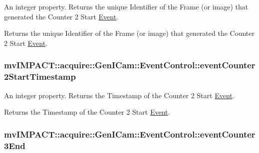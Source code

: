 An integer property. Returns the unique Identifier of the Frame (or image) that generated the Counter 2 Start \hyperlink{classmv_i_m_p_a_c_t_1_1acquire_1_1_event}{Event}. 

Returns the unique Identifier of the Frame (or image) that generated the Counter 2 Start \hyperlink{classmv_i_m_p_a_c_t_1_1acquire_1_1_event}{Event}. \hypertarget{classmv_i_m_p_a_c_t_1_1acquire_1_1_gen_i_cam_1_1_event_control_a5704b9998f9c86ece2bdfa825b7e3216}{
\subsubsection[{event\+Counter2\+Start\+Timestamp}]{ mv\+I\+M\+P\+A\+C\+T\+::acquire\+::\+Gen\+I\+Cam\+::\+Event\+Control\+::event\+Counter2\+Start\+Timestamp}}\label{classmv_i_m_p_a_c_t_1_1acquire_1_1_gen_i_cam_1_1_event_control_a5704b9998f9c86ece2bdfa825b7e3216}


An integer property. Returns the Timestamp of the Counter 2 Start \hyperlink{classmv_i_m_p_a_c_t_1_1acquire_1_1_event}{Event}. 

Returns the Timestamp of the Counter 2 Start \hyperlink{classmv_i_m_p_a_c_t_1_1acquire_1_1_event}{Event}. \hypertarget{classmv_i_m_p_a_c_t_1_1acquire_1_1_gen_i_cam_1_1_event_control_aeabdf10aee695943d0e55c09e7ff4fc7}{
\subsubsection[{event\+Counter3\+End}]{ mv\+I\+M\+P\+A\+C\+T\+::acquire\+::\+Gen\+I\+Cam\+::\+Event\+Control\+::event\+Counter3\+End}}\label{classmv_i_m_p_a_c_t_1_1acquire_1_1_gen_i_cam_1_1_event_control_aeabdf10aee695943d0e55c09e7ff4fc7}


